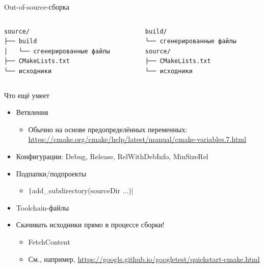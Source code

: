 \documentclass[aspectratio=169]{beamer}
\begin{document}
\begin{frame}[fragile]{Out-of-source-сборка}
    \begin{columns}
        \begin{column}{0.5\textwidth}
            \begin{verbatim}
source/
├── build
│   └── сгенерированные файлы
├── CMakeLists.txt
└── исходники
                \end{verbatim}
        \end{column}
        \begin{column}{0.5\textwidth}
            \begin{verbatim}
build/
└── сгенерированные файлы
source/
├── CMakeLists.txt
└── исходники
                \end{verbatim}
        \end{column}
    \end{columns}
\end{frame}

\begin{frame}{Что ещё умеет}
    \begin{itemize}
        \item Ветвления
              \begin{itemize}
                  \item Обычно на основе предопределённых переменных: \url{https://cmake.org/cmake/help/latest/manual/cmake-variables.7.html}
              \end{itemize}
        \item Конфигурации: Debug, Release, RelWithDebInfo, MinSizeRel
        \item Подпапки/подпроекты
              \begin{itemize}
                  \item \texttt|add_subdirectory(sourceDir ...)|
              \end{itemize}
        \item Toolchain-файлы
        \item Скачивать исходники прямо в процессе сборки!
              \begin{itemize}
                  \item FetchContent
                  \item См., например, \url{https://google.github.io/googletest/quickstart-cmake.html}
              \end{itemize}
    \end{itemize}
\end{frame}
\end{document}
